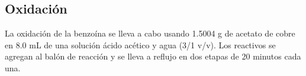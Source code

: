 \documentclass[fleqn,10pt]{SelfArx}
\begin{document}
\subsection{Oxidaci\'on}
La oxidaci\'on de la benzo\'ina se lleva a cabo usando 1.5004 g de acetato de cobre en 8.0 mL de una soluci\'on \'acido ac\'etico y agua (3/1 v/v). Los reactivos se agregan al bal\'on de reacci\'on y se lleva a reflujo en dos etapas de 20 minutos cada una. 




\end{document}
